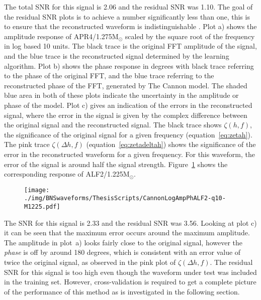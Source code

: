 The total SNR for this signal is 2.06 and the residual SNR was 1.10. The goal of the residual SNR plots is to achieve a number significantly less than one, this is to ensure that the reconstructed waveform is indistinguishable . Plot a) shows the amplitude response of APR4/1.275M$_\odot$ scaled by the square root of the frequency in log based 10 units. The black trace is the original FFT amplitude of the signal, and the blue trace is the reconstructed signal determined by the learning algorithm. Plot b) shows the phase response in degrees with black trace referring to the phase of the original FFT, and the blue trace referring to the reconstructed phase of the FFT, generated by The Cannon model. The shaded blue area in both of these plots indicate the uncertainty in the amplitude or phase of the model. Plot c) gives an indication of the errors in the reconstructed signal, where the error in the signal is given by the complex difference between the original signal and the reconstructed signal. The black trace shows $\zeta(h,f)$,  the significance of the original signal for a given frequency (equation~\ref{eq:zetah}). The pink trace $\zeta(\Delta h,f)$ (equation~\ref{eq:zetadeltah}) shows the significance of the error in the reconstructed waveform for a given frequency. For this waveform, the error of the signal is around half the signal strength. Figure~\ref{fig:CannonLogAmpPhALF2-q10-M1225} shows the corresponding response of ALF2/1.225M$_\odot$. 
\begin{figure}[H]
	\texttt{[image: ./img/BNSwaveforms/ThesisScripts/CannonLogAmpPhALF2-q10-M1225.pdf]} 
	\caption[\protect]{\protect}
	\label{fig:CannonLogAmpPhALF2-q10-M1225}
\end{figure} 
The SNR for this signal is 2.33 and the residual SNR was 3.56. Looking at plot c) it can be seen that the maximum error occurs around the maximum amplitude. The amplitude in plot~a) looks fairly close to the original signal, however the \textit{phase} is off by around 180 degrees, which is consistent with an error value of twice the original signal, as observed in the pink plot of $\zeta(\Delta h,f)$. The residual SNR for this signal is too high even though the waveform under test was included in the training set. However, cross-validation is required to get a complete picture of the performance of this method as is investigated in the following section. 
